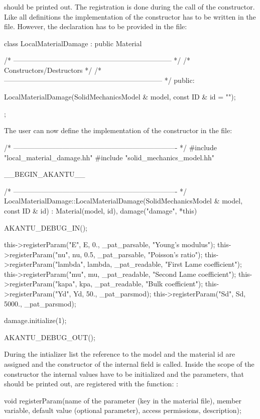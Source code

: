 should be printed out. The registration is done during the call of the
constructor. Like all definitions the implementation of the
constructor has to be written in the 
file. However, the declaration has to be provided in the
 file:
\begin{cpp}
class LocalMaterialDamage : public Material {
  /* -------------------------------------------------------------------- */
  /* Constructors/Destructors                                             */
  /* -------------------------------------------------------------------- */
public:

  LocalMaterialDamage(SolidMechanicsModel & model, const ID & id = "");
};
\end{cpp}
The user can now define the implementation of the constructor in the
 file:
\begin{cpp}
/* ---------------------------------------------------------------------- */
#include "local_material_damage.hh"
#include "solid_mechanics_model.hh"

__BEGIN_AKANTU__

/* ---------------------------------------------------------------------- */
LocalMaterialDamage::LocalMaterialDamage(SolidMechanicsModel & model,
					 const ID & id)  :
  Material(model, id),
  damage("damage", *this) {
  AKANTU_DEBUG_IN();

  this->registerParam("E", E, 0., _pat_parsable, "Young's modulus");
  this->registerParam("nu", nu, 0.5, _pat_parsable, "Poisson's ratio");
  this->registerParam("lambda", lambda, _pat_readable, "First Lame coefficient");
  this->registerParam("mu", mu, _pat_readable, "Second Lame coefficient");
  this->registerParam("kapa", kpa, _pat_readable, "Bulk coefficient");
  this->registerParam("Yd", Yd,   50., _pat_parsmod);
  this->registerParam("Sd", Sd, 5000., _pat_parsmod);

  damage.initialize(1);

  AKANTU_DEBUG_OUT();
}
\end{cpp}
During the intializer list the reference to the model and the material id are
assigned and the constructor of the internal field is called. Inside the scope
of the constructor the internal values have to be initialized and the
parameters, that should be printed out, are registered with the function:
:
\begin{cpp}
void registerParam(name of the parameter (key in the material file),
		   member variable,
		   default value (optional parameter),
		   access permissions,
		   description);
\end{cpp}
